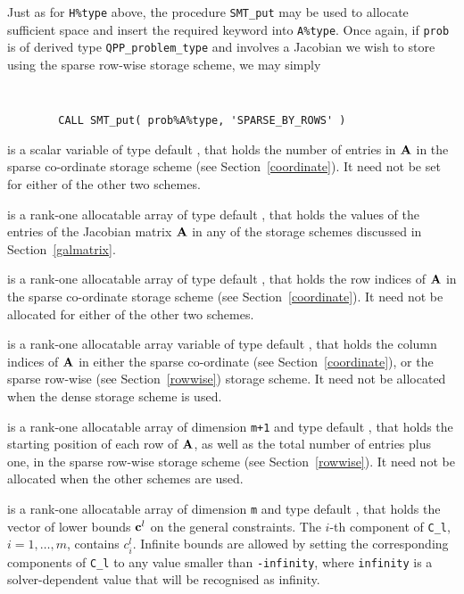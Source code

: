 \documentclass{galahad}
\newcommand{\packagename}{QPP}
\begin{document}
\begin{description}
\begin{description}
Just as for {\tt H\%type} above, the procedure {\tt SMT\_put}
may be used to allocate sufficient space and insert the required keyword
into {\tt A\%type}.
Once again, if {\tt prob} is of derived type {\tt \packagename\_problem\_type}
and involves a Jacobian we wish to store using the sparse row-wise
storage scheme, we may simply
{\tt
\begin{verbatim}
        CALL SMT_put( prob%A%type, 'SPARSE_BY_ROWS' )
\end{verbatim}
}
\noindent

 is a scalar variable of type default \integer, that
holds the number of entries in ${\mathbf{A}}$
in the sparse co-ordinate storage scheme (see Section~\ref{coordinate}).
It need not be set for either of the other two schemes.

 is a rank-one allocatable array of type default \realdp, that holds
the values of the entries of the Jacobian matrix ${\mathbf{A}}$ in any of the
storage schemes discussed in Section~\ref{galmatrix}.

 is a rank-one allocatable array of type default \integer,
that holds the row indices of ${\mathbf{A}}$ in the sparse co-ordinate storage
scheme (see Section~\ref{coordinate}).
It need not be allocated for either of the other two schemes.

 is a rank-one allocatable array variable of type default \integer,
that holds the column indices of ${\mathbf{A}}$ in either the sparse co-ordinate
(see Section~\ref{coordinate}), or the sparse row-wise
(see Section~\ref{rowwise}) storage scheme.
It need not be allocated when the dense storage scheme is used.

 is a rank-one allocatable array of dimension {\tt m+1} and type
default \integer, that holds the
starting position of each row of ${\mathbf{A}}$, as well
as the total number of entries plus one, in the sparse row-wise storage
scheme (see Section~\ref{rowwise}). It need not be allocated when the
other schemes are used.

\end{description}

 is a rank-one allocatable array of dimension {\tt m} and type
default \realdp, that holds the vector of lower bounds ${\mathbf{c}}^{l}$
on the general constraints. The $i$-th component of
{\tt C\_l}, $i = 1, \ldots , m$, contains $c_{i}^{l}$.
Infinite bounds are allowed by setting the corresponding
components of {\tt C\_l} to any value smaller than {\tt -infinity},
where {\tt infinity} is a  solver-dependent value that will be recognised as
infinity.


\end{description}
\end{document}
